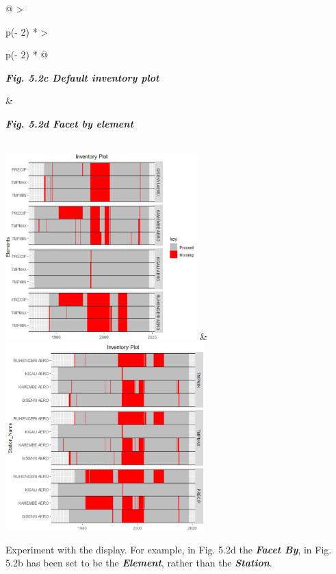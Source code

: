 \documentclass[
  letterpaper,
  DIV=11,
  numbers=noendperiod]{scrreprt}
\begin{document}
\begin{longtable}[]{@{}
  >{\raggedright\arraybackslash}p{(\columnwidth - 2\tabcolsep) * }
  >{\raggedright\arraybackslash}p{(\columnwidth - 2\tabcolsep) * }@{}}
\toprule\noalign{}
\begin{minipage}[b]{\linewidth}\raggedright
\textbf{\emph{Fig. 5.2c Default inventory plot}}
\end{minipage} & \begin{minipage}[b]{\linewidth}\raggedright
\textbf{\emph{Fig. 5.2d Facet by element}}
\end{minipage} \\
\midrule\noalign{}
\endhead
\bottomrule\noalign{}
\endlastfoot
\includegraphics[width=2.90928in,height=2.83047in]{figures/Fig5.2c.png}
&
\includegraphics[width=3.02691in,height=2.83944in]{figures/Fig5.2d.png} \\
\end{longtable}

Experiment with the display. For example, in Fig. 5.2d the
\textbf{\emph{Facet By}}, in Fig. 5.2b has been set to be the
\textbf{\emph{Element}}, rather than the \textbf{\emph{Station}}.
\end{document}
